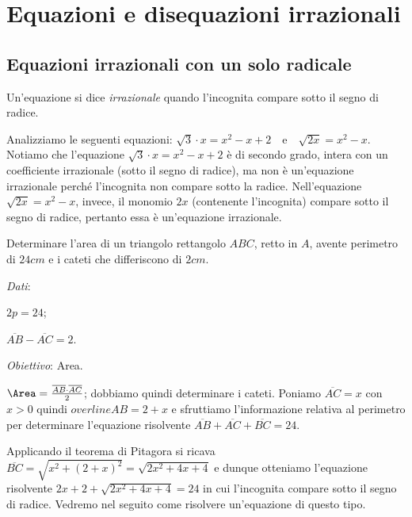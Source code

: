 \chapter{Equazioni e disequazioni irrazionali}
\section{Equazioni irrazionali con un solo radicale}

\begin{definizione}
Un'equazione si dice \emph{irrazionale} quando l'incognita compare sotto il segno di radice.
\end{definizione}

Analizziamo le seguenti equazioni: $\sqrt 3\cdot x=x^2-x+2$~~e~~$\sqrt{2x}=x^2-x$.
Notiamo che l'equazione $\sqrt 3\cdot x=x^2-x+2$ è di secondo grado, intera con un coefficiente irrazionale (sotto il segno di radice), ma non è un'equazione irrazionale perché l'incognita non compare sotto la radice.
Nell'equazione $\sqrt{2x}=x^2-x$, invece, il monomio $ 2x $ (contenente l'incognita) compare sotto il segno di radice, pertanto essa è un'equazione irrazionale.
\begin{problema}
Determinare l'area di un triangolo rettangolo $ABC$, retto in $A$, avente perimetro di $24\unit{cm}$ e i cateti che differiscono di $2\unit{cm}$.
\end{problema}

\begin{multicols}{2}
\emph{Dati}:

$2p=24$;

$\overline{AB}-\overline{AC}=2$.

\emph{Obiettivo}:
Area.


\end{multicols}

\begin{soluzione}
${\Area}=\frac{\overline{AB}\cdot \overline{AC}} 2$; dobbiamo quindi determinare i cateti. Poniamo $\overline{AC}=x$ con $x>0$ quindi $overline{AB}=2+x$ e sfruttiamo l'informazione relativa al perimetro per determinare l'equazione risolvente $\overline{AB}+\overline{AC}+\overline{BC}=24$.

Applicando il teorema di Pitagora si ricava $\overline{BC}=\sqrt{x^2+(2+x)^2}=\sqrt{2x^2+4x+4}$ e dunque otteniamo l'equazione risolvente $2x+2+\sqrt{2x^2+4x+4}=24$ in cui l'incognita compare sotto il segno di radice. Vedremo nel seguito come risolvere un'equazione di questo tipo.
\end{soluzione}

